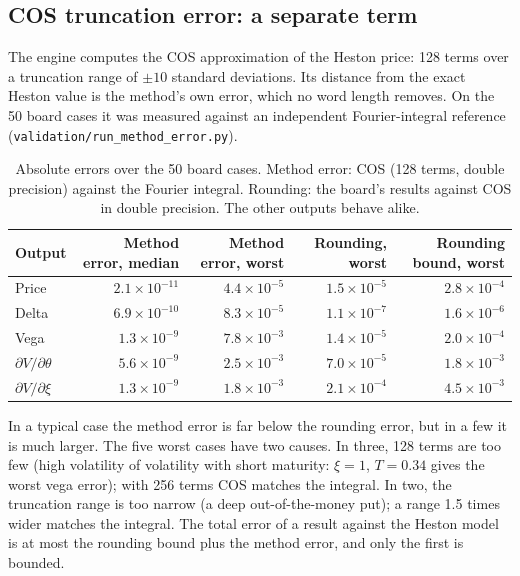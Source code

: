 \documentclass[11pt,a4paper]{article}
\begin{document}
\subsection{COS truncation error: a separate term}
\label{sec:methoderr}
The engine computes the COS approximation of the Heston price: 128 terms over a
truncation range of $\pm10$ standard deviations. Its distance from the exact Heston
value is the method's own error, which no word length removes. On the 50 board cases it
was measured against an independent Fourier-integral reference
(\texttt{validation/run\_method\_error.py}).

\begin{table}[H]
\centering
\small
\begin{tabular}{@{}lrrrr@{}}
\toprule
\textbf{Output} & \textbf{Method error, median} & \textbf{Method error, worst} & \textbf{Rounding, worst} & \textbf{Rounding bound, worst}\\
\midrule
Price & $2.1\times10^{-11}$ & $4.4\times10^{-5}$ & $1.5\times10^{-5}$ & $2.8\times10^{-4}$\\
Delta & $6.9\times10^{-10}$ & $8.3\times10^{-5}$ & $1.1\times10^{-7}$ & $1.6\times10^{-6}$\\
Vega & $1.3\times10^{-9}$ & $7.8\times10^{-3}$ & $1.4\times10^{-5}$ & $2.0\times10^{-4}$\\
$\partial V/\partial\theta$ & $5.6\times10^{-9}$ & $2.5\times10^{-3}$ & $7.0\times10^{-5}$ & $1.8\times10^{-3}$\\
$\partial V/\partial\xi$ & $1.3\times10^{-9}$ & $1.8\times10^{-3}$ & $2.1\times10^{-4}$ & $4.5\times10^{-3}$\\
\bottomrule
\end{tabular}
\caption{Absolute errors over the 50 board cases. Method error: COS (128 terms, double
precision) against the Fourier integral. Rounding: the board's results against COS in
double precision. The other outputs behave alike.}
\label{tab:methoderr}
\end{table}

In a typical case the method error is far below the rounding error, but in a few it is
much larger. The five worst cases have two causes. In three, 128 terms are too few (high
volatility of volatility with short maturity: $\xi = 1$, $T = 0.34$ gives the worst vega
error); with 256 terms COS matches the integral. In two, the truncation range is
too narrow (a deep out-of-the-money put); a range 1.5 times wider matches the integral.
The total error of a result against the Heston model is at most the rounding bound plus
the method error, and only the first is bounded.
\end{document}
